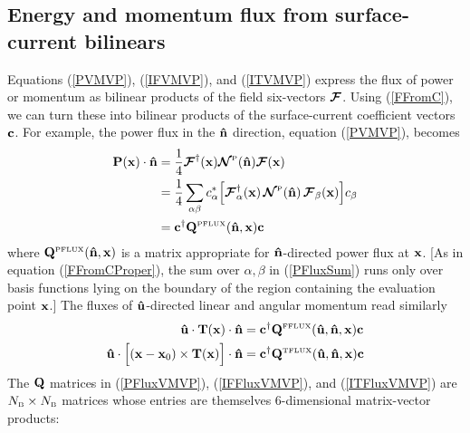 \documentclass[letterpaper]{article}
\begin{document}
\subsection*{Energy and momentum flux from surface-current bilinears}

Equations (\ref{PVMVP}), (\ref{IFVMVP}), and (\ref{ITVMVP}) express
the flux of power or momentum as bilinear products of the field
six-vectors $\boldsymbol{\mathcal{F}}$. Using (\ref{FFromC}), we can turn these into
bilinear products of the surface-current coefficient vectors
$\mathbf{c}$. For example, the power flux in the $\mathbf{\hat n}$
direction, equation (\ref{PVMVP}), becomes 
\begin{align}
 \mathbf{P}(\mathbf{x}) \cdot \mathbf{\hat n}
&=\frac{1}{4}\boldsymbol{\mathcal{F}}^\dagger(\mathbf{x}) \boldsymbol{\mathcal{N}}^{\hbox{\tiny{P}}}(\mathbf{\hat n}) \boldsymbol{\mathcal{F}}(\mathbf{x})
\nonumber \\
&=\frac{1}{4}\sum_{\alpha \beta} 
  c_\alpha^* 
  \Big[ \boldsymbol{\mathcal{F}}^\dagger_\alpha(\mathbf{x})
        \,
        \boldsymbol{\mathcal{N}}^{\hbox{\tiny{P}}}(\mathbf{\hat n})
        \,
        \boldsymbol{\mathcal{F}}_\beta(\mathbf{x})
  \Big]
  c_\beta 
\label{PFluxSum}\\
&= \mathbf{c}^\dagger \mathbf{Q}^{\hbox{\tiny{PFLUX}}}(\mathbf{\hat n}, \mathbf{x}) \mathbf{c} 
\label{PFluxVMVP}
\end{align}
where $\mathbf{Q}^{\hbox{\tiny{PFLUX}}}(\mathbf{\hat n}, \mathbf{x})$ is a matrix 
appropriate for $\mathbf{\hat n}$-directed power flux at $\mathbf{x}$.
[As in equation (\ref{FFromCProper}), the sum over 
 $\alpha,\beta$ in (\ref{PFluxSum}) runs only over basis 
 functions lying on the boundary of the region
 containing the evaluation point $\mathbf{x}$.]
The fluxes of $\mathbf{\hat u}$-directed linear and angular 
momentum read similarly
\begin{align}
\mathbf{\hat u} \cdot \mathbf{T}(\mathbf{x}) \cdot \mathbf{\hat n}
&= \mathbf{c}^\dagger \mathbf{Q}^{\hbox{\tiny{FFLUX}}}(\mathbf{\hat u}, \mathbf{\hat n}, \mathbf{x}) \mathbf{c}
\label{IFFluxVMVP}
\\
\mathbf{\hat u} 
 \cdot \Big[ (\mathbf{x}-\mathbf{x}_0) \times \mathbf{T}(\mathbf{x}) \Big]
 \cdot \mathbf{\hat n}
&= \mathbf{c}^\dagger \mathbf{Q}^{\hbox{\tiny{TFLUX}}}(\mathbf{\hat u}, \mathbf{\hat n}, \mathbf{x}) \mathbf{c}
\label{ITFluxVMVP}
\end{align}
The $\mathbf{Q}$ matrices in (\ref{PFluxVMVP}), (\ref{IFFluxVMVP}), and 
(\ref{ITFluxVMVP}) are $N_{\hbox{\tiny{B}}}\times N_{\hbox{\tiny{B}}}$ matrices
whose entries are themselves 6-dimensional matrix-vector products:
\end{document}
